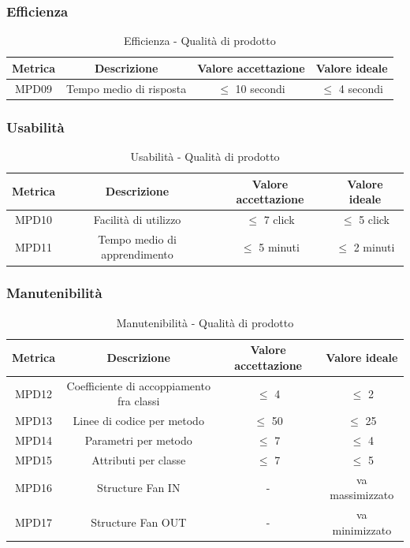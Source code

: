 \documentclass[10pt]{article}
\begin{document}
\begin{justify}
\subsubsection{Efficienza}
\begin{table}[H]
  \centering
\begin{tabular}{|c|c|c|c|}
  \hline
  \textbf{Metrica} & \textbf{Descrizione} & \textbf{Valore accettazione} & \textbf{Valore ideale}\\
  \hline
  MPD09 & Tempo medio di risposta & $\leq$ 10 secondi & $\leq$ 4 secondi \\
  \hline
\end{tabular}
\caption{Efficienza - Qualità di prodotto}
\label{tab:efficienza}
\end{table}

\subsubsection{Usabilità}
\begin{table}[H]
  \centering
\begin{tabular}{|c|c|c|c|}
  \hline
  \textbf{Metrica} & \textbf{Descrizione} & \textbf{Valore accettazione} & \textbf{Valore ideale}\\
  \hline
  MPD10 & Facilità di utilizzo & $\leq$ 7 click & $\leq$ 5 click\\
  \hline
  MPD11 & Tempo medio di apprendimento & $\leq$ 5 minuti & $\leq$ 2 minuti \\
  \hline
\end{tabular}
\caption{Usabilità - Qualità di prodotto}
\label{tab:usabilità}
\end{table}

\subsubsection{Manutenibilità}
\begin{table}[H]
  \centering
\begin{tabular}{|c|c|c|c|}
  \hline
  \textbf{Metrica} & \textbf{Descrizione} & \textbf{Valore accettazione} & \textbf{Valore ideale}\\
  \hline
  MPD12 & Coefficiente di accoppiamento fra classi & $\leq$ 4 & $\leq$ 2 \\
  \hline
  MPD13 & Linee di codice per metodo & $\leq$ 50 & $\leq$ 25 \\
  \hline
  MPD14 & Parametri per metodo & $\leq$ 7 & $\leq$ 4 \\
  \hline
  MPD15 & Attributi per classe & $\leq$ 7 & $\leq$ 5 \\
  \hline
  MPD16 & Structure Fan IN & - & va massimizzato \\
  \hline
  MPD17 & Structure Fan OUT & - & va minimizzato \\
  \hline
\end{tabular}
\caption{Manutenibilità - Qualità di prodotto}
\label{tab:manutenibilità}
\end{table}


\end{justify}
\end{document}

